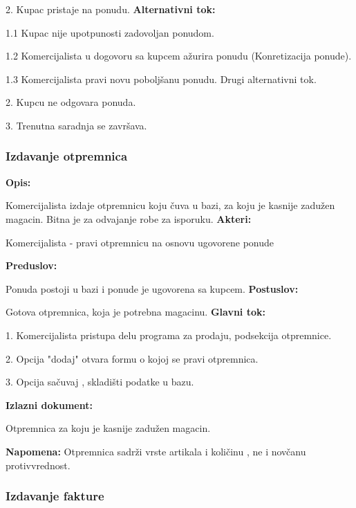 2. Kupac pristaje na ponudu.
\newline
\textbf{Alternativni tok:}

1.1 Kupac nije upotpunosti zadovoljan ponudom.

1.2 Komercijalista u dogovoru sa kupcem ažurira ponudu (Konretizacija ponude).

1.3 Komercijalista pravi novu poboljšanu ponudu.
\newline
Drugi alternativni tok.

2. Kupcu ne odgovara ponuda.

3. Trenutna saradnja se završava.

\clearpage

\subsubsection{Izdavanje otpremnica}

\textbf{Opis:}

Komercijalista izdaje otpremnicu koju čuva u bazi, za koju je kasnije zadužen magacin. Bitna je za odvajanje robe za isporuku.
\newline
\textbf{Akteri:}

Komercijalista - pravi otpremnicu na osnovu ugovorene ponude

\textbf{Preduslov:}

Ponuda postoji u bazi i ponude je ugovorena sa kupcem.
\newline
\textbf{Postuslov:}

Gotova otpremnica, koja je potrebna magacinu.
\newline
\textbf{Glavni tok:}

1. Komercijalista pristupa delu programa za prodaju, podsekcija otpremnice.

2. Opcija "dodaj" otvara formu o kojoj se pravi otpremnica.

3. Opcija sačuvaj , skladišti podatke u bazu.
\newline

\textbf{Izlazni dokument:}

Otpremnica za koju je kasnije zadužen magacin.

\textbf{Napomena:}
Otpremnica sadrži vrste artikala i količinu , ne i novčanu protivvrednost.

\subsubsection{Izdavanje fakture}

